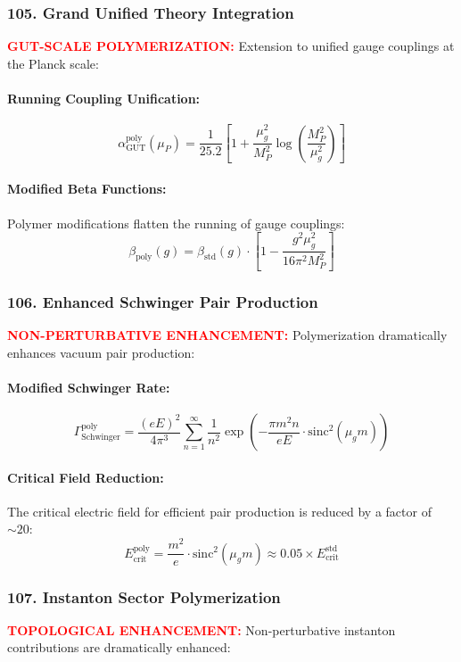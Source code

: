 \documentclass[11pt]{article}
\begin{document}
\subsubsection*{105. Grand Unified Theory Integration}
\textcolor{red}{\textbf{GUT-SCALE POLYMERIZATION:}} Extension to unified gauge couplings at the Planck scale:

\paragraph{Running Coupling Unification:}
\[
  \alpha_{\text{GUT}}^{\text{poly}}(\mu_P) = \frac{1}{25.2} \left[1 + \frac{\mu_g^2}{M_P^2} \log\left(\frac{M_P^2}{\mu_g^2}\right)\right]
\]

\paragraph{Modified Beta Functions:}
Polymer modifications flatten the running of gauge couplings:
\[
  \beta_{\text{poly}}(g) = \beta_{\text{std}}(g) \cdot \left[1 - \frac{g^2 \mu_g^2}{16\pi^2 M_P^2}\right]
\]

\subsubsection*{106. Enhanced Schwinger Pair Production}
\textcolor{red}{\textbf{NON-PERTURBATIVE ENHANCEMENT:}} Polymerization dramatically enhances vacuum pair production:

\paragraph{Modified Schwinger Rate:}
\[
  \Gamma_{\text{Schwinger}}^{\text{poly}} = \frac{(eE)^2}{4\pi^3} \sum_{n=1}^\infty \frac{1}{n^2} \exp\left(-\frac{\pi m^2 n}{eE} \cdot \text{sinc}^2(\mu_g m)\right)
\]

\paragraph{Critical Field Reduction:}
The critical electric field for efficient pair production is reduced by a factor of $\sim 20$:
\[
  E_{\text{crit}}^{\text{poly}} = \frac{m^2}{e} \cdot \text{sinc}^2(\mu_g m) \approx 0.05 \times E_{\text{crit}}^{\text{std}}
\]

\subsubsection*{107. Instanton Sector Polymerization}
\textcolor{red}{\textbf{TOPOLOGICAL ENHANCEMENT:}} Non-perturbative instanton contributions are dramatically enhanced:
\end{document}
